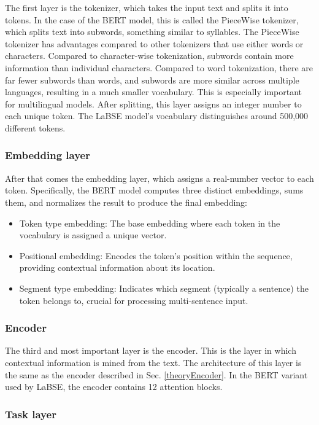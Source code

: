 The first layer is the tokenizer, which takes the input text and splits it into tokens. In the case of the BERT model, this is called the PieceWise tokenizer, which splits text into subwords, something similar to syllables. The PieceWise tokenizer has advantages compared to other tokenizers that use either words or characters. Compared to character-wise tokenization, subwords contain more information than individual characters. Compared to word tokenization, there are far fewer subwords than words, and subwords are more similar across multiple languages, resulting in a much smaller vocabulary. This is especially important for multilingual models. After splitting, this layer assigns an integer number to each unique token. The LaBSE model’s vocabulary distinguishes around 500,000 different tokens.

\subsubsection{Embedding layer}

After that comes the embedding layer, which assigns a real-number vector to each token. Specifically, the BERT model computes three distinct embeddings, sums them, and normalizes the result to produce the final embedding:

\begin{itemize}
	\item Token type embedding: The base embedding where each token in the vocabulary is assigned a unique vector.
	\item Positional embedding: Encodes the token’s position within the sequence, providing contextual information about its location.
	\item Segment type embedding: Indicates which segment (typically a sentence) the token belongs to, crucial for processing multi-sentence input.
\end{itemize}

\subsubsection{Encoder}

The third and most important layer is the encoder. This is the layer in which contextual information is mined from the text. The architecture of this layer is the same as the encoder described in Sec. \ref{theoryEncoder}. In the BERT variant used by LaBSE, the encoder contains 12 attention blocks.

\subsubsection{Task layer}

